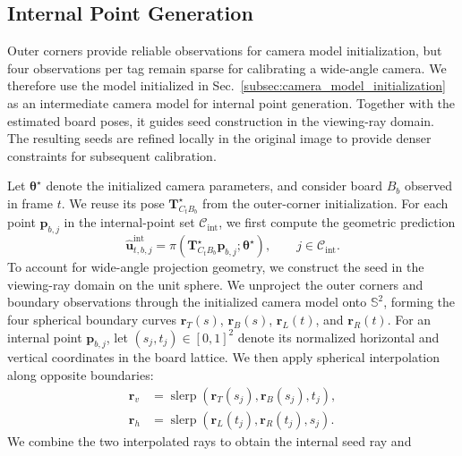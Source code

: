 \documentclass[letterpaper, 10 pt, conference]{ieeeconf}  %
\begin{document}
\subsection{Internal Point Generation}

Outer corners provide reliable observations for camera model initialization,
but four observations per tag remain sparse for calibrating a wide-angle
camera. We therefore use the model initialized in
Sec.~\ref{subsec:camera_model_initialization} as an intermediate camera model
for internal point generation. Together with the estimated board poses, it
guides seed construction in the viewing-ray domain. The resulting seeds are
refined locally in the original image to provide denser constraints for
subsequent calibration.

Let $\boldsymbol{\theta}^{\star}$ denote the initialized camera parameters, and
consider board $B_b$ observed in frame $t$. We reuse its pose
$\mathbf{T}_{C_tB_b}^{\star}$ from the outer-corner initialization. For each point
$\mathbf{p}_{b,j}$ in the internal-point set $\mathcal{C}_{\mathrm{int}}$, we
first compute the geometric prediction
\begin{equation}
\hat{\mathbf{u}}_{t,b,j}^{\mathrm{int}}
=
\pi\!\left(
\mathbf{T}_{C_tB_b}^{\star}\mathbf{p}_{b,j};
\boldsymbol{\theta}^{\star}
\right),
\qquad j\in\mathcal{C}_{\mathrm{int}}.
\label{eq:internal_prediction}
\end{equation}
To account for wide-angle projection geometry, we construct the seed in the
viewing-ray domain on the unit sphere. We unproject the outer corners and
boundary observations through the initialized camera model onto $\mathbb{S}^2$,
forming the four spherical boundary curves $\mathbf{r}_{T}(s)$,
$\mathbf{r}_{B}(s)$, $\mathbf{r}_{L}(t)$, and $\mathbf{r}_{R}(t)$. For an
internal point $\mathbf{p}_{b,j}$, let $(s_j,t_j)\in[0,1]^2$ denote its
normalized horizontal and vertical coordinates in the board lattice. We then
apply spherical interpolation along opposite boundaries:
\begin{equation}
\begin{split}
\mathbf{r}_{v}
&=
\operatorname{slerp}\!\left(
\mathbf{r}_{T}(s_j),\mathbf{r}_{B}(s_j),t_j
\right),\\
\mathbf{r}_{h}
&=
\operatorname{slerp}\!\left(
\mathbf{r}_{L}(t_j),\mathbf{r}_{R}(t_j),s_j
\right).
\end{split}
\label{eq:spherical_boundary_interp}
\end{equation}
We combine the two interpolated rays to obtain the internal seed ray and
\end{document}

